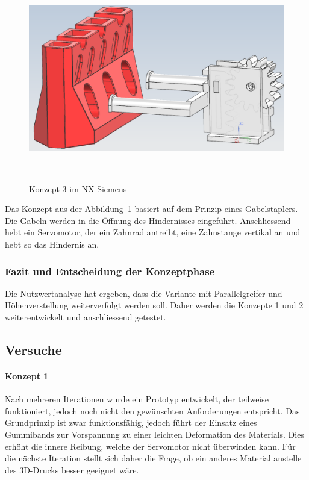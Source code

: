 \documentclass[main.tex]{subfiles} %
\begin{document}
\begin{figure}[H]
    \centering
    \includegraphics[width=1\textwidth]{Konzept_3_Gabelstapler.png}
    \caption{Konzept 3 im NX Siemens}~\label{fig:Konzept_3}
\end{figure}

Das Konzept aus der Abbildung~\ref{fig:Konzept_3} basiert auf dem Prinzip eines Gabelstaplers. Die Gabeln werden in die Öffnung des Hindernisses eingeführt. 
Anschliessend hebt ein Servomotor, der ein Zahnrad antreibt, eine Zahnstange vertikal an und hebt so das Hindernis an.


\newpage

\subsubsection*{Fazit und Entscheidung der Konzeptphase}

Die Nutzwertanalyse hat ergeben, dass die Variante mit Parallelgreifer und Höhenverstellung weiterverfolgt werden soll. 
Daher werden die Konzepte 1 und 2 weiterentwickelt und anschliessend getestet.

\subsection*{Versuche}

\paragraph{Konzept 1}

Nach mehreren Iterationen wurde ein Prototyp entwickelt, der teilweise funktioniert, jedoch noch nicht den gewünschten 
Anforderungen entspricht. Das Grundprinzip ist zwar funktionsfähig, jedoch führt der Einsatz eines Gummibands zur Vorspannung 
zu einer leichten Deformation des Materials. Dies erhöht die innere Reibung, welche der Servomotor nicht überwinden kann. 
Für die nächste Iteration stellt sich daher die Frage, ob ein anderes Material anstelle des 3D-Drucks besser geeignet wäre.
\end{document}
